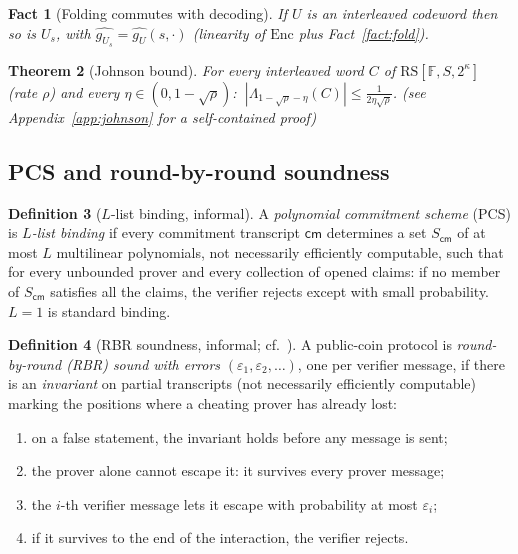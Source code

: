 \documentclass[11pt]{article}
\newcommand{\F}{\mathbb{F}}
\newcommand{\Enc}{\mathrm{Enc}}
\newcommand{\RS}{\mathrm{RS}}
\newcommand{\Lam}{\Lambda}
\newcommand{\pol}[1]{\widehat{#1}}
\theoremstyle{plain}
\newtheorem{theorem}{Theorem}[section]
\newtheorem{fact}[theorem]{Fact}
\theoremstyle{definition}
\newtheorem{definition}[theorem]{Definition}
\theoremstyle{remark}
\begin{document}
\begin{fact}[Folding commutes with decoding]\label{fact:fold-decode}
If $U$ is an interleaved codeword then so is $U_s$, with $\pol{g_{U_s}} = \pol{g_U}(s, \cdot)$ (linearity of $\Enc$ plus Fact~\ref{fact:fold}).
\end{fact}

\begin{theorem}[Johnson bound]\label{thm:johnson-interleaved}
For every interleaved word $C$ of $\RS[\F,S,2^\kappa]$ (rate $\rho$) and every $\eta \in (0, 1-\sqrt{\rho})$: $\ |\Lam_{1-\sqrt{\rho}-\eta}(C)| \le \frac{1}{2\eta\sqrt{\rho}}$. (see Appendix~\ref{app:johnson} for a self-contained proof)
\end{theorem}

\subsection{PCS and round-by-round soundness}\label{sec:iopcs}

\begin{definition}[$L$-list binding, informal]\label{def:listbinding}
A \emph{polynomial commitment scheme} (PCS) is \emph{$L$-list binding} if every commitment transcript $\mathsf{cm}$ determines a set $S_{\mathsf{cm}}$ of at most $L$ multilinear polynomials, not necessarily efficiently computable, such that for every unbounded prover and every collection of opened claims: if no member of $S_{\mathsf{cm}}$ satisfies all the claims, the verifier rejects except with small probability. $L = 1$ is standard binding.
\end{definition}

\begin{definition}[RBR soundness, informal; cf.~\cite{CCHLRR19,ACFY25}]\label{def:rbr}
A public-coin protocol is \emph{round-by-round (RBR) sound with errors} $(\varepsilon_1, \varepsilon_2, \dots)$, one per verifier message, if there is an \emph{invariant} on partial transcripts (not necessarily efficiently computable) marking the positions where a cheating prover has already lost:
\begin{enumerate}[itemsep=1pt,label=(\roman*)]
\item on a false statement, the invariant holds before any message is sent;
\item the prover alone cannot escape it: it survives every prover message;
\item the $i$-th verifier message lets it escape with probability at most $\varepsilon_i$;
\item if it survives to the end of the interaction, the verifier rejects.
\end{enumerate}
\end{definition}
\end{document}
